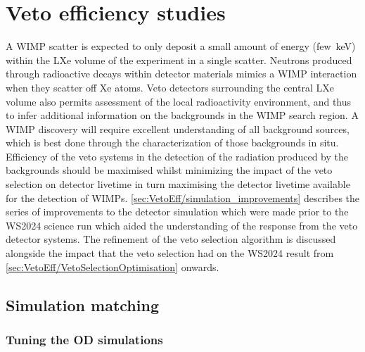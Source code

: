 \chapter{Veto efficiency studies}\label{chap:VetoEfficiency}
A WIMP scatter is expected to only deposit a small amount of energy (few~keV) within the LXe volume of the experiment in a single scatter. Neutrons produced through radioactive decays within detector materials mimics a WIMP interaction when they scatter off Xe atoms. Veto detectors surrounding the central LXe volume also permits assessment of the local radioactivity environment, and thus to infer additional information on the backgrounds in the WIMP search region. A WIMP discovery will require excellent understanding of all background sources, which is best done through the characterization of those backgrounds in situ. Efficiency of the veto systems in the detection of the radiation produced by the backgrounds should be maximised whilst minimizing the impact of the veto selection on detector livetime in turn maximising the detector livetime available for the detection of WIMPs. \autoref{sec:VetoEff/simulation_improvements} describes the series of improvements to the detector simulation which were made prior to the WS2024 science run which aided the understanding of the response from the veto detector systems. The refinement of the veto selection algorithm is discussed alongside the impact that the veto selection had on the WS2024 result from \autoref{sec:VetoEff/VetoSelectionOptimisation} onwards.

\section{Simulation matching}\label{sec:VetoEff/simulation_improvements}
\subsection{Tuning the OD simulations}
